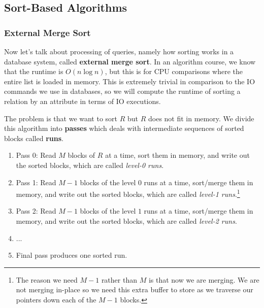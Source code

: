 \documentclass{article}
\begin{document}
  \subsection{Sort-Based Algorithms}

    \subsubsection{External Merge Sort}

      Now let's talk about processing of queries, namely how sorting works in a database system, called \textbf{external merge sort}. In an algorithm course, we know that the runtime is $O(n \log{n})$, but this is for CPU comparisons where the entire list is loaded in memory. This is extremely trivial in comparison to the IO commands we use in databases, so we will compute the runtime of sorting a relation by an attribute in terms of IO executions. 

      The problem is that we want to sort $R$ but $R$ does not fit in memory. We divide this algorithm into \textbf{passes} which deals with intermediate sequences of sorted blocks called \textbf{runs}. 
      \begin{enumerate}
        \item Pass 0: Read $M$ blocks of $R$ at a time, sort them in memory, and write out the sorted blocks, which are called \textit{level-0 runs}. 
        \item Pass 1: Read $M-1$ blocks of the level $0$ runs at a time, sort/merge them in memory, and write out the sorted blocks, which are called \textit{level-1 runs}.\footnote{The reason we need $M-1$ rather than $M$ is that now we are merging. We are not merging in-place so we need this extra buffer to store as we traverse our pointers down each of the $M-1$ blocks.}
        \item Pass 2: Read $M-1$ blocks of the level $1$ runs at a time, sort/merge them in memory, and write out the sorted blocks, which are called \textit{level-2 runs}. 
        \item ...  
        \item Final pass produces one sorted run. 
      \end{enumerate}
\end{document}
